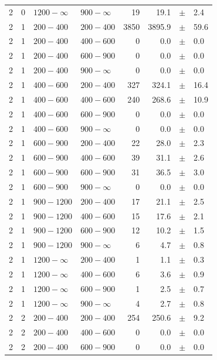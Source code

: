 \begin{table}[!h]
\begin{tabular}{rrllrrcl}
2 & 0 & $1200- \infty$ & $900-\infty$ &     19 &     19.1 &$\pm$&    2.4 \\
2 & 1 & $ 200- 400$ & $200-400$ &   3850 &   3895.9 &$\pm$&   59.6 \\
2 & 1 & $ 200- 400$ & $400-600$ &      0 &      0.0 &$\pm$&    0.0 \\
2 & 1 & $ 200- 400$ & $600-900$ &      0 &      0.0 &$\pm$&    0.0 \\
2 & 1 & $ 200- 400$ & $900-\infty$ &      0 &      0.0 &$\pm$&    0.0 \\
2 & 1 & $ 400- 600$ & $200-400$ &    327 &    324.1 &$\pm$&   16.4 \\
2 & 1 & $ 400- 600$ & $400-600$ &    240 &    268.6 &$\pm$&   10.9 \\
2 & 1 & $ 400- 600$ & $600-900$ &      0 &      0.0 &$\pm$&    0.0 \\
2 & 1 & $ 400- 600$ & $900-\infty$ &      0 &      0.0 &$\pm$&    0.0 \\
2 & 1 & $ 600- 900$ & $200-400$ &     22 &     28.0 &$\pm$&    2.3 \\
2 & 1 & $ 600- 900$ & $400-600$ &     39 &     31.1 &$\pm$&    2.6 \\
2 & 1 & $ 600- 900$ & $600-900$ &     31 &     36.5 &$\pm$&    3.0 \\
2 & 1 & $ 600- 900$ & $900-\infty$ &      0 &      0.0 &$\pm$&    0.0 \\
2 & 1 & $ 900-1200$ & $200-400$ &     17 &     21.1 &$\pm$&    2.5 \\
2 & 1 & $ 900-1200$ & $400-600$ &     15 &     17.6 &$\pm$&    2.1 \\
2 & 1 & $ 900-1200$ & $600-900$ &     12 &     10.2 &$\pm$&    1.5 \\
2 & 1 & $ 900-1200$ & $900-\infty$ &      6 &      4.7 &$\pm$&    0.8 \\
2 & 1 & $1200- \infty$ & $200-400$ &      1 &      1.1 &$\pm$&    0.3 \\
2 & 1 & $1200- \infty$ & $400-600$ &      6 &      3.6 &$\pm$&    0.9 \\
2 & 1 & $1200- \infty$ & $600-900$ &      1 &      2.5 &$\pm$&    0.7 \\
2 & 1 & $1200- \infty$ & $900-\infty$ &      4 &      2.7 &$\pm$&    0.8 \\
2 & 2 & $ 200- 400$ & $200-400$ &    254 &    250.6 &$\pm$&    9.2 \\
2 & 2 & $ 200- 400$ & $400-600$ &      0 &      0.0 &$\pm$&    0.0 \\
2 & 2 & $ 200- 400$ & $600-900$ &      0 &      0.0 &$\pm$&    0.0 \\

\end{tabular}
\end{table}

